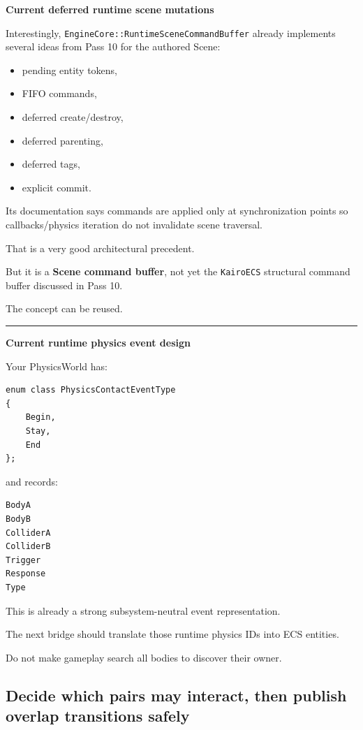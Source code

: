 \textbf{Current deferred runtime scene mutations}

Interestingly, \texttt{EngineCore::RuntimeSceneCommandBuffer} already implements several ideas from Pass 10 for the authored Scene:

\begin{itemize}
\tightlist
\item
  pending entity tokens,
\item
  FIFO commands,
\item
  deferred create/destroy,
\item
  deferred parenting,
\item
  deferred tags,
\item
  explicit commit.
\end{itemize}

Its documentation says commands are applied only at synchronization points so callbacks/physics iteration do not invalidate scene traversal.

That is a very good architectural precedent.

But it is a \textbf{Scene command buffer}, not yet the \texttt{KairoECS} structural command buffer discussed in Pass 10.

The concept can be reused.

\begin{center}\rule{0.5\linewidth}{0.5pt}\end{center}

\textbf{Current runtime physics event design}

Your PhysicsWorld has:

\begin{verbatim}
enum class PhysicsContactEventType
{
    Begin,
    Stay,
    End
};
\end{verbatim}

and records:

\begin{verbatim}
BodyA
BodyB
ColliderA
ColliderB
Trigger
Response
Type
\end{verbatim}

This is already a strong subsystem-neutral event representation.

The next bridge should translate those runtime physics IDs into ECS entities.

Do not make gameplay search all bodies to discover their owner.

\subsection{Decide which pairs may interact, then publish overlap transitions safely}\label{05-engine-i-ch017-decide-which-pairs-may-interact-then-publish-overlap-transitions-safely}

